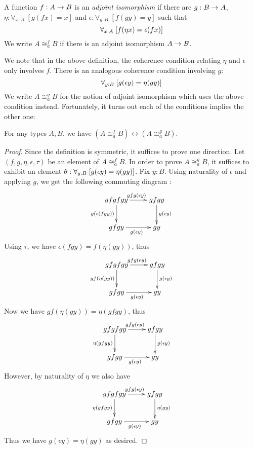 \begin{defn} A function $f:A\rightarrow B$ is an {\em adjoint isomorphism} if there are $g:B\rightarrow A$, $\eta:\forall_{x:A}\; [g(fx)=x]$ and $\epsilon:\forall_{y:B}\; [f(gy)=y]$ such that 
  \[\forall_{x:A}\;[{f}\!\left({\eta x}\right) = \epsilon(fx)]\]
We write $A\cong^f_a B$ if there is an adjoint isomorphism $A\rightarrow B$.
\end{defn}
We note that in the above definition, the coherence condition relating $\eta$ and $\epsilon$ only involves $f$. There is an analogous coherence condition involving $g$:
  \[\forall_{y:B}\;[{g}\!\left({\epsilon y}\right) = \eta(gy)]\]
We write $A\cong^g_a B$ for the notion of adjoint isomorphism which uses the above condition instead. Fortunately, it turns out each of the conditions implies the other one: 

\begin{thm}\label{thm:coh-equiv}
For any types $A, B$, we have $(A\cong^f_a B) \leftrightarrow (A\cong^g_a B)$.
\end{thm}
\begin{proof}
Since the definition is symmetric, it suffices to prove one direction. Let $(f,g,\eta,\epsilon,\tau)$ be an element of $A\cong^f_a B$. In order to prove $A\cong^g_a B$, it suffices to exhibit an element $\theta : \forall_{y:B}\;[{g}\!\left({\epsilon y}\right) = \eta(gy)]$. Fix $y : B$. Using naturality of $\epsilon$ and applying $g$, we get the following commuting diagram :
\[\uppercurveobject{{ }}\lowercurveobject{{ }}\twocellhead{{ }}
  \xymatrix{gfgfgy \ar^{gfg(\epsilon y)}[r] \ar_{g(\epsilon (fgy))}[d] & gfgy \ar^{g(\epsilon y)}[d] \\ gfgy \ar_{g(\epsilon y)}[r] & gy
  }\]
Using $\tau$, we have $\epsilon (fgy) = f (\eta (gy))$, thus
\[\uppercurveobject{{ }}\lowercurveobject{{ }}\twocellhead{{ }}
  \xymatrix{gfgfgy \ar^{gfg(\epsilon y)}[r] \ar_{gf(\eta (gy))}[d] & gfgy \ar^{g(\epsilon y)}[d] \\ gfgy \ar_{g(\epsilon y)}[r] & gy
  }\]
Now we have $gf(\eta(gy)) = \eta(gfgy)$, thus
\[\uppercurveobject{{ }}\lowercurveobject{{ }}\twocellhead{{ }}
  \xymatrix{gfgfgy \ar^{gfg(\epsilon y)}[r] \ar_{\eta (gfgy)}[d] & gfgy \ar^{g(\epsilon y)}[d] \\ gfgy \ar_{g(\epsilon y)}[r] & gy
  }\]
However, by naturality of $\eta$ we also have
\[\uppercurveobject{{ }}\lowercurveobject{{ }}\twocellhead{{ }}
  \xymatrix{gfgfgy \ar^{gfg(\epsilon y)}[r] \ar_{\eta (gfgy)}[d] & gfgy \ar^{\eta(gy)}[d] \\ gfgy \ar_{g(\epsilon y)}[r] & gy 
  }\]
Thus we have $g(\epsilon y) = \eta(g y)$ as desired.
\end{proof}

